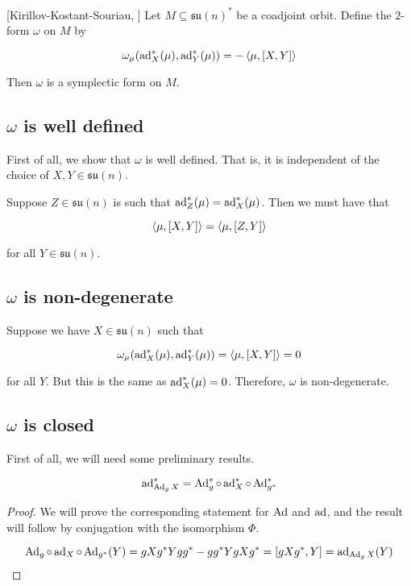 \documentclass{article}
\newcommand{\su}{\mathfrak{su}}
\begin{document}
\begin{theorem}
    \label{thm:kks}
    [Kirillov-Kostant-Souriau, \cite[Theorem 14.4.1]{marsden_ratiu}]
    Let \(M \subseteq \su(n)^*\) be a coadjoint orbit. Define the \(2\)-form \(\omega\) on \( M\) by

    \[\omega_\mu(\operatorname{ad}_X^*(\mu), \operatorname{ad}_Y^*(\mu)) = -\left\langle \mu, [X, Y] \right\rangle\]

    Then \(\omega\) is a symplectic form on \( M\).
\end{theorem}

\subsection{\(\omega\) is well defined}

First of all, we show that \(\omega\) is well defined. That is, it is independent of the choice of \(X, Y \in \su(n)\).

Suppose \(Z \in \su(n)\) is such that \(\operatorname{ad}_Z^*(\mu) = \operatorname{ad}_X^*(\mu)\). Then we must have that

\[\left\langle \mu, [X, Y] \right\rangle = \left\langle \mu, [Z, Y] \right\rangle\]

for all \(Y \in \su(n)\).

\subsection{\(\omega\) is non-degenerate}

Suppose we have \(X \in \su(n)\) such that

\[\omega_\mu(\operatorname{ad}_X^*(\mu), \operatorname{ad}_Y^*(\mu)) = \left\langle \mu, [X, Y] \right\rangle = 0\]

for all \(Y\). But this is the same as \(\operatorname{ad}_X^*(\mu) = 0\). Therefore, \(\omega\) is non-degenerate.

\subsection{\(\omega\) is closed}

First of all, we will need some preliminary results.

\begin{lemma}
    \label{lem:ad_Ad}
    \[\operatorname{ad}_{\operatorname{Ad}_gX}^* = \operatorname{Ad}_g^* \circ \operatorname{ad}_X^* \circ \operatorname{Ad}_{g^*}^*\]
\end{lemma}

\begin{proof}
    We will prove the corresponding statement for \(\operatorname{Ad}\) and \(\operatorname{ad}\), and the result will follow by conjugation with the isomorphism \(\Phi\).

    \[\operatorname{Ad}_g \circ \operatorname{ad}_X \circ \operatorname{Ad}_{g^*}(Y)= gX g^* Y g g^* - g g^* Y g X g^* = [gX g^*, Y] = \operatorname{ad}_{\operatorname{Ad}_gX}(Y)\]
\end{proof}
\end{document}
